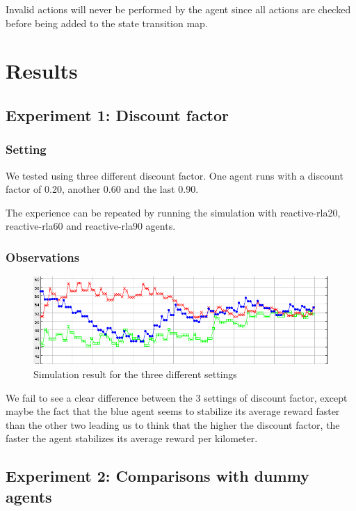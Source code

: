\documentclass[11pt]{article}
\begin{document}
Invalid actions will never be performed by the agent since all actions
are checked before being added to the state transition map.

\section{Results}

\subsection{Experiment 1: Discount factor}

\subsubsection{Setting}
We tested using three different discount factor. One agent runs with a
discount factor of 0.20, another 0.60 and the last 0.90.

The experience can be repeated by running the simulation with
reactive-rla20, reactive-rla60 and reactive-rla90 agents.

\subsubsection{Observations}
\begin{figure}
  \caption{Simulation result for the three different settings}
  \includegraphics[scale=0.7]{compare_discount}
  \centering
\end{figure}

We fail to see a clear difference between the 3 settings of discount
factor, except maybe the fact that the blue agent seems to stabilize
its average reward faster than the other two leading us to think that
the higher the discount factor, the faster the agent stabilizes its
average reward per kilometer.

\subsection{Experiment 2: Comparisons with dummy agents}
\end{document}
